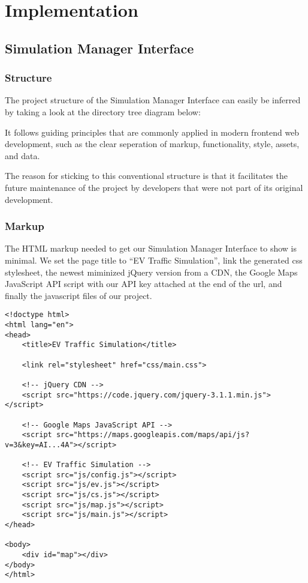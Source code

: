 \chapter{Implementation}

\section{Simulation Manager Interface}

\subsection{Structure}

The project structure of the Simulation Manager Interface can easily be inferred by taking a look at the directory tree diagram below:

\vspace{3mm}

It follows guiding principles that are commonly applied in modern frontend web development, such as the clear seperation of markup, functionality, style, assets, and data.

The reason for sticking to this conventional structure is that it facilitates the future maintenance of the project by developers that were not part of its original development.

\subsection{Markup}

The HTML markup needed to get our Simulation Manager Interface to show is minimal. We set the page title to ``EV Traffic Simulation'', link the generated css stylesheet, the newest miminized jQuery version from a CDN, the Google Maps JavaScript API script with our API key attached at the end of the url, and finally the javascript files of our project.

\begin{verbatim}
<!doctype html>
<html lang="en">
<head>
    <title>EV Traffic Simulation</title>

    <link rel="stylesheet" href="css/main.css">

    <!-- jQuery CDN -->
    <script src="https://code.jquery.com/jquery-3.1.1.min.js"></script>

    <!-- Google Maps JavaScript API -->
    <script src="https://maps.googleapis.com/maps/api/js?v=3&key=AI...4A"></script>

    <!-- EV Traffic Simulation -->
    <script src="js/config.js"></script>
    <script src="js/ev.js"></script>
    <script src="js/cs.js"></script>
    <script src="js/map.js"></script>
    <script src="js/main.js"></script>
</head>

<body>
    <div id="map"></div>
</body>
</html>
\end{verbatim}

